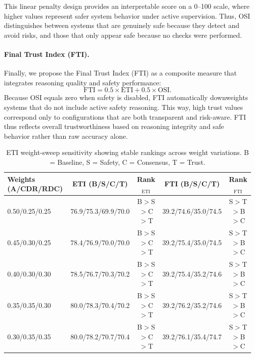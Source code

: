\documentclass[letterpaper]{article} %
\begin{document}
This linear penalty design provides an interpretable score on a 0–100 scale, where higher values represent safer system behavior under active supervision.  
Thus, OSI distinguishes between systems that are genuinely safe because they detect and avoid risks, and those that only appear safe because no checks were performed.

\paragraph{Final Trust Index (FTI).}
Finally, we propose the Final Trust Index (FTI) as a composite measure that integrates reasoning quality and safety performance:
\[
\mathrm{FTI} = 0.5 \times \mathrm{ETI} + 0.5 \times \mathrm{OSI}.
\]
Because OSI equals zero when safety is disabled, FTI automatically downweights systems that do not include active safety reasoning.  
This way, high trust values correspond only to configurations that are both transparent and risk-aware.  
FTI thus reflects overall trustworthiness based on reasoning integrity and safe behavior rather than raw accuracy alone.




\begin{table}[t]
\centering
\caption{ETI weight-sweep sensitivity showing stable rankings across weight variations. 
B = Baseline, S = Safety, C = Consensus, T = Trust.}
\label{tab:eti_weight_sweep}
\begin{tabular}{lcccc}
\toprule
\textbf{Weights (A/CDR/RDC)} & \textbf{ETI (B/S/C/T)} & \textbf{Rank$_\text{ETI}$} & \textbf{FTI (B/S/C/T)} & \textbf{Rank$_\text{FTI}$} \\
\midrule
0.50/0.25/0.25 & 76.9/75.3/69.9/70.0 & B$>$S$>$C$>$T & 39.2/74.6/35.0/74.5 & S$>$T$>$B$>$C \\
0.45/0.30/0.25 & 78.4/76.9/70.0/70.0 & B$>$S$>$C$>$T & 39.2/75.4/35.0/74.5 & S$>$T$>$B$>$C \\
0.40/0.30/0.30 & 78.5/76.7/70.3/70.2 & B$>$S$>$C$>$T & 39.2/75.4/35.2/74.6 & S$>$T$>$B$>$C \\
0.35/0.35/0.30 & 80.0/78.3/70.4/70.2 & B$>$S$>$C$>$T & 39.2/76.2/35.2/74.6 & S$>$T$>$B$>$C \\
0.30/0.35/0.35 & 80.0/78.2/70.7/70.4 & B$>$S$>$C$>$T & 39.2/76.1/35.4/74.7 & S$>$T$>$B$>$C \\
\bottomrule
\end{tabular}
\end{table}
\end{document}

